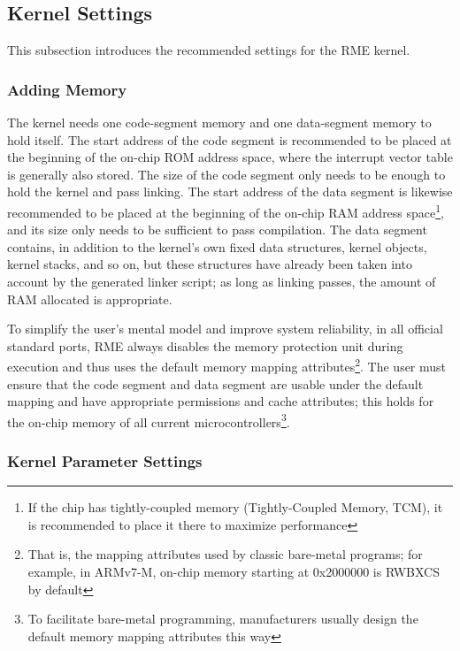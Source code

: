 \subsection{Kernel Settings}\label{subsec:6-5-2}

This subsection introduces the recommended settings for the RME kernel.

\subsubsection{Adding Memory}\label{subsubsec:6-5-2-1}

The kernel needs one code-segment memory and one data-segment memory to hold itself. The start address of the code segment is recommended to be placed at the beginning of the on-chip ROM address space, where the interrupt vector table is generally also stored. The size of the code segment only needs to be enough to hold the kernel and pass linking. The start address of the data segment is likewise recommended to be placed at the beginning of the on-chip RAM address space\footnote{If the chip has tightly-coupled memory (Tightly-Coupled
  Memory, TCM), it is recommended to place it there to maximize performance}, and its size only needs to be sufficient to pass compilation. The data segment contains, in addition to the kernel's own fixed data structures, kernel objects, kernel stacks, and so on, but these structures have already been taken into account by the generated linker script; as long as linking passes, the amount of RAM allocated is appropriate.

To simplify the user's mental model and improve system reliability, in all official standard ports, RME always disables the memory protection unit during execution and thus uses the default memory mapping attributes\footnote{That is, the mapping attributes used by classic bare-metal programs; for example, in ARMv7-M, on-chip memory starting at 0x2000000 is RWBXCS by default}. The user must ensure that the code segment and data segment are usable under the default mapping and have appropriate permissions and cache attributes; this holds for the on-chip memory of all current microcontrollers\footnote{To facilitate bare-metal programming, manufacturers usually design the default memory mapping attributes this way}.

\subsubsection{Kernel Parameter Settings}\label{subsubsec:6-5-2-2}

